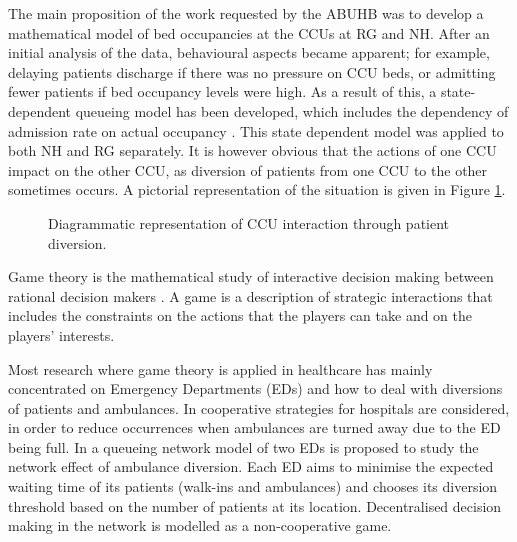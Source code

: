 \documentclass{article}
\begin{document}
The main proposition of the work requested by the ABUHB was to develop a mathematical model of bed occupancies at the CCUs at RG and NH.
After an initial analysis of the data, behavioural aspects became apparent; for example, delaying patients discharge if there was no pressure on CCU beds, or admitting fewer patients if bed occupancy levels were high.
As a result of this, a state-dependent queueing model has been developed, which includes the dependency of admission rate on actual occupancy \cite{Komenda2013}.
This state dependent model was applied to both NH and RG separately.
It is however obvious that the actions of one CCU impact on the other CCU, as diversion of patients from one CCU to the other sometimes occurs.
A pictorial representation of the situation is given in Figure \ref{diagramofdiversion}.

\begin{figure}[!htbp]
\begin{center}
\caption{Diagrammatic representation of CCU interaction through patient diversion.}\label{diagramofdiversion}
\end{center}
\end{figure}

Game theory is the mathematical study of interactive decision making between rational decision makers \cite{Maschler2013}.
A game is a description of strategic interactions that includes the constraints on the actions that the players can take and on the players' interests.

Most research where game theory is applied in healthcare has mainly concentrated on Emergency Departments (EDs) and how to deal with diversions of patients and ambulances.
In \cite{Hagtvedt2009} cooperative strategies for hospitals are considered, in order to reduce occurrences when ambulances are turned away due to the ED being full.
In \cite{Deo2011} a queueing network model of two EDs is proposed to study the network effect of ambulance diversion.
Each ED aims to minimise the expected waiting time of its patients (walk-ins and ambulances) and chooses its diversion threshold based on the number of patients at its location. Decentralised decision making in the network is modelled as a non-cooperative game.
\end{document}
